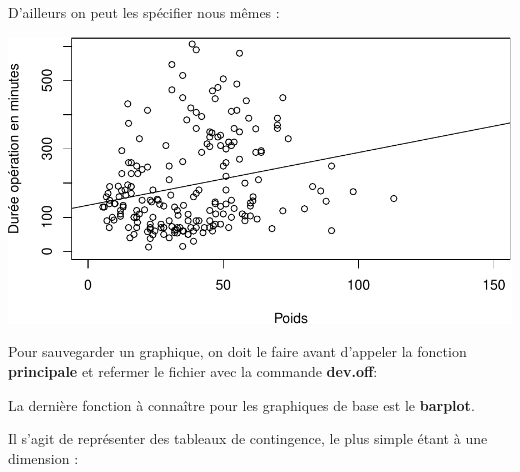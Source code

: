 \documentclass[
]{book}
\newenvironment{Shaded}{\begin{snugshade}}{\end{snugshade}}
\newcommand{\AttributeTok}[1]{\textcolor[rgb]{0.13,0.29,0.53}{#1}}
\newcommand{\DecValTok}[1]{\textcolor[rgb]{0.00,0.00,0.81}{#1}}
\newcommand{\FunctionTok}[1]{\textcolor[rgb]{0.13,0.29,0.53}{\textbf{#1}}}
\newcommand{\NormalTok}[1]{#1}
\newcommand{\OtherTok}[1]{\textcolor[rgb]{0.56,0.35,0.01}{#1}}
\newcommand{\SpecialCharTok}[1]{\textcolor[rgb]{0.81,0.36,0.00}{\textbf{#1}}}
\newcommand{\StringTok}[1]{\textcolor[rgb]{0.31,0.60,0.02}{#1}}
\begin{document}
D'ailleurs on peut les spécifier nous mêmes :

\begin{Shaded}
\end{Shaded}

\includegraphics{_main_files/figure-latex/poids11-1.pdf}

Pour sauvegarder un graphique, on doit le faire avant d'appeler la fonction
\textbf{principale} et refermer le fichier avec la commande \textbf{dev.off}:

La dernière fonction à connaître pour les graphiques de base est le \textbf{barplot}.

Il s'agit de représenter des tableaux de contingence, le plus simple étant à une
dimension :

\begin{Shaded}
\end{Shaded}
\end{document}

